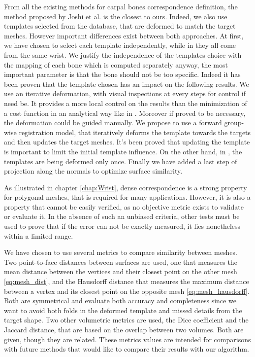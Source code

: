From all the existing methods for carpal bones correspondence definition, the method proposed by Joshi et al. \cite{joshi_2016_registration-based} is the closest to ours. Indeed, we also use templates selected from the database, that are deformed to match the target meshes. However important differences exist between both approaches. At first, we have chosen to select each template independently, while in \cite{joshi_2016_registration-based} they all come from the same wrist. We justify the independence of the templates choice with the mapping of each bone which is computed separately anyway, the most important parameter is that the bone should not be too specific. Indeed it has been proven that the template chosen has an impact on the following results. We use an iterative deformation, with visual inspections at every steps for control if need be. It provides a more local control on the results than the minimization of a cost function in an analytical way like in \cite{joshi_2016_registration-based}. Moreover if proved to be necessary, the deformation could be guided manually. We propose to use a forward group-wise registration model, that iteratively deforms the template towards the targets and then updates the target meshes. It's been proved that updating the template is important to limit the initial template influence. On the other hand, in \cite{joshi_2016_registration-based}, the templates are being deformed only once. Finally we have added a last step of projection along the normals to optimize surface similarity.

As illustrated in chapter \ref{chap:Wrist}, dense correspondence is a strong property for polygonal meshes, that is required for many applications. However, it is also a property that cannot be easily verified, as no objective metric exists to validate or evaluate it. In the absence of such an unbiased criteria, other tests must be used to prove that if the error can not be exactly measured, it lies nonetheless within a limited range. 


We have chosen to use several metrics to compare similarity between meshes. Two point-to-face distances between surfaces are used, one that measures the mean distance between the vertices and their closest point on the other mesh \eqref{eq:mesh_dist}, and the Hausdorff distance that measures the maximum distance between a vertex and its closest point on the opposite mesh \eqref{eq:mesh_hausdorff}. Both are symmetrical and evaluate both accuracy and completeness since we want to avoid both folds in the deformed template and missed details from the target shape. Two other volumetric metrics are used, the Dice coefficient and the Jaccard distance, that are based on the overlap between two volumes. Both are given, though they are related. These metrics values are intended for comparisons with future methods that would like to compare their results with our algorithm. 



